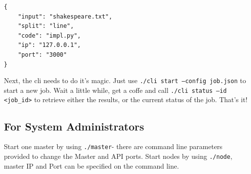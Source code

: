 \documentclass[a4paper]{article}
\begin{document}
\begin{verbatim}
{
	"input": "shakespeare.txt",
	"split": "line",
	"code": "impl.py",
	"ip": "127.0.0.1",
	"port": "3000"
}
\end{verbatim}

Next, the cli needs to do it's magic. Just use \texttt{./cli start --config job.json} to start a new job. Wait a little while, get a coffe and call  \texttt{./cli status --id <job_id>} to retrieve either the results, or the current status of the job. That's it!

\hypertarget{for-system-administrators}{%
\subsection{For System Administrators}\label{for-system-administrators}}

Start one master by using  \texttt{./master}- there are command line parameters provided to change the Master and API ports.
Start nodes by using  \texttt{./node}, master IP and Port can be specified on the command line.
\end{document}
